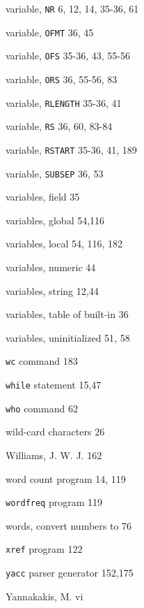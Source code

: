 \begin{multicols}{3}
\hangindent=3pc  variable, \verb'NR' 6, 12, 14, 35-36, 61

\hangindent=3pc  variable, \verb'OFMT' 36, 45

\hangindent=3pc  variable, \verb'OFS' 35-36, 43, 55-56

\hangindent=3pc  variable, \verb'ORS' 36, 55-56, 83

\hangindent=3pc  variable, \verb'RLENGTH' 35-36, 41

\hangindent=3pc  variable, \verb'RS' 36, 60, 83-84

\hangindent=3pc  variable, \verb'RSTART' 35-36, 41, 189

\hangindent=3pc  variable, \verb'SUBSEP' 36, 53

\hangindent=3pc  variables, field 35

\hangindent=3pc  variables, global 54,116

\hangindent=3pc  variables, local 54, 116, 182

\hangindent=3pc  variables, numeric 44

\hangindent=3pc  variables, string 12,44

\hangindent=3pc  variables, table of built-in 36

\hangindent=3pc  variables, uninitialized 51, 58

\hangindent=3pc  \verb'wc' command 183

\hangindent=3pc  \verb'while' statement 15,47

\hangindent=3pc  \verb'who' command 62

\hangindent=3pc  wild-card characters 26

\hangindent=3pc  Williams, J. W. J. 162

\hangindent=3pc  word count program 14, 119

\hangindent=3pc  \verb'wordfreq' program 119

\hangindent=3pc  words, convert numbers to 76

\hangindent=3pc  \verb'xref' program 122

\hangindent=3pc  \verb'yacc' parser generator 152,175

\hangindent=3pc  Yannakakis, M. vi

\end{multicols}
